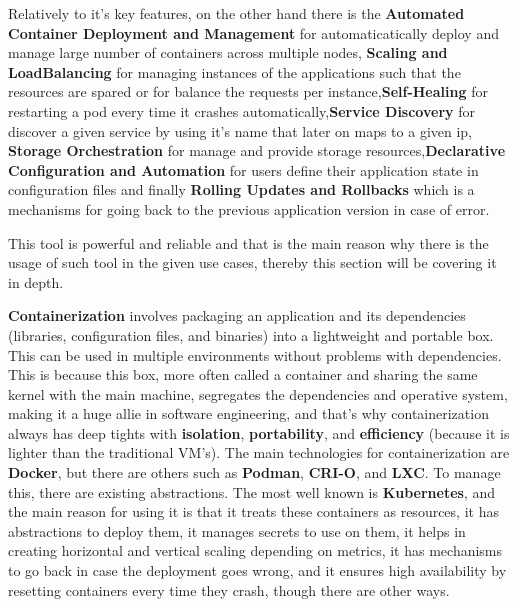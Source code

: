 Relatively to it's key features, on the other hand there is the \textbf{Automated Container Deployment and Management} for automaticatically deploy and manage large number of containers across multiple nodes, \textbf{Scaling and LoadBalancing} for managing instances of the applications such that the resources are spared or for balance the requests per instance,\textbf{Self-Healing} for restarting a pod every time it crashes automatically,\textbf{Service Discovery} for discover a given service by using it's name that later on maps to a given ip, \textbf{Storage Orchestration} for manage and provide storage resources,\textbf{Declarative Configuration and Automation} for users define their application state in configuration files and finally \textbf{Rolling Updates and Rollbacks} which is a mechanisms for going back to the previous application version in case of error.

This tool is powerful and reliable and that is the main reason why there is the usage of such tool in the given use cases, thereby this section will be covering it in depth.

\textbf{Containerization} involves packaging an application and its dependencies (libraries, configuration files, and binaries) into a lightweight and portable box. This can be used in multiple environments without problems with dependencies. This is because this box, more often called a container and  sharing the same kernel with the main machine, segregates the dependencies and operative system, making it a huge allie in software engineering, and that's why containerization always has deep tights with \textbf{isolation}, \textbf{portability}, and \textbf{efficiency} (because it is lighter than the traditional VM's). The main technologies for containerization are \textbf{Docker}, but there are others such as \textbf{Podman}, \textbf{CRI-O}, and \textbf{LXC}. To manage this, there are existing abstractions. The most well known is \textbf{Kubernetes}, and the main reason for using it is that it treats these containers as resources, it has abstractions to deploy them, it manages secrets to use on them, it helps in creating horizontal and vertical scaling depending on metrics, it has mechanisms to go back in case the deployment goes wrong, and it ensures high availability by resetting containers every time they crash, though there are other ways.

